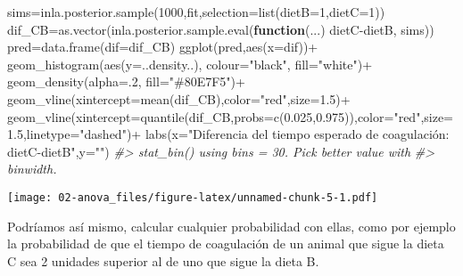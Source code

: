 \documentclass[
]{book}
\newenvironment{Shaded}{\begin{snugshade}}{\end{snugshade}}
\newcommand{\AttributeTok}[1]{\textcolor[rgb]{0.77,0.63,0.00}{#1}}
\newcommand{\CommentTok}[1]{\textcolor[rgb]{0.56,0.35,0.01}{\textit{#1}}}
\newcommand{\ControlFlowTok}[1]{\textcolor[rgb]{0.13,0.29,0.53}{\textbf{#1}}}
\newcommand{\DecValTok}[1]{\textcolor[rgb]{0.00,0.00,0.81}{#1}}
\newcommand{\FloatTok}[1]{\textcolor[rgb]{0.00,0.00,0.81}{#1}}
\newcommand{\FunctionTok}[1]{\textcolor[rgb]{0.00,0.00,0.00}{#1}}
\newcommand{\NormalTok}[1]{#1}
\newcommand{\OtherTok}[1]{\textcolor[rgb]{0.56,0.35,0.01}{#1}}
\newcommand{\SpecialCharTok}[1]{\textcolor[rgb]{0.00,0.00,0.00}{#1}}
\newcommand{\StringTok}[1]{\textcolor[rgb]{0.31,0.60,0.02}{#1}}
\begin{document}
\begin{Shaded}
\begin{Highlighting}[]
\NormalTok{sims}\OtherTok{=}\FunctionTok{inla.posterior.sample}\NormalTok{(}\DecValTok{1000}\NormalTok{,fit,}\AttributeTok{selection=}\FunctionTok{list}\NormalTok{(}\AttributeTok{dietB=}\DecValTok{1}\NormalTok{,}\AttributeTok{dietC=}\DecValTok{1}\NormalTok{))}
\NormalTok{dif\_CB}\OtherTok{=}\FunctionTok{as.vector}\NormalTok{(}\FunctionTok{inla.posterior.sample.eval}\NormalTok{(}\ControlFlowTok{function}\NormalTok{(...) dietC}\SpecialCharTok{{-}}\NormalTok{dietB, sims))}
\NormalTok{pred}\OtherTok{=}\FunctionTok{data.frame}\NormalTok{(}\AttributeTok{dif=}\NormalTok{dif\_CB)}
\FunctionTok{ggplot}\NormalTok{(pred,}\FunctionTok{aes}\NormalTok{(}\AttributeTok{x=}\NormalTok{dif))}\SpecialCharTok{+}
  \FunctionTok{geom\_histogram}\NormalTok{(}\FunctionTok{aes}\NormalTok{(}\AttributeTok{y=}\NormalTok{..density..), }\AttributeTok{colour=}\StringTok{"black"}\NormalTok{, }\AttributeTok{fill=}\StringTok{"white"}\NormalTok{)}\SpecialCharTok{+}
 \FunctionTok{geom\_density}\NormalTok{(}\AttributeTok{alpha=}\NormalTok{.}\DecValTok{2}\NormalTok{, }\AttributeTok{fill=}\StringTok{"\#80E7F5"}\NormalTok{)}\SpecialCharTok{+}
  \FunctionTok{geom\_vline}\NormalTok{(}\AttributeTok{xintercept=}\FunctionTok{mean}\NormalTok{(dif\_CB),}\AttributeTok{color=}\StringTok{"red"}\NormalTok{,}\AttributeTok{size=}\FloatTok{1.5}\NormalTok{)}\SpecialCharTok{+}
  \FunctionTok{geom\_vline}\NormalTok{(}\AttributeTok{xintercept=}\FunctionTok{quantile}\NormalTok{(dif\_CB,}\AttributeTok{probs=}\FunctionTok{c}\NormalTok{(}\FloatTok{0.025}\NormalTok{,}\FloatTok{0.975}\NormalTok{)),}\AttributeTok{color=}\StringTok{"red"}\NormalTok{,}\AttributeTok{size=}\FloatTok{1.5}\NormalTok{,}\AttributeTok{linetype=}\StringTok{"dashed"}\NormalTok{)}\SpecialCharTok{+}
  \FunctionTok{labs}\NormalTok{(}\AttributeTok{x=}\StringTok{"Diferencia del tiempo esperado de coagulación: dietC{-}dietB"}\NormalTok{,}\AttributeTok{y=}\StringTok{""}\NormalTok{)}
\CommentTok{\#\textgreater{} \textasciigrave{}stat\_bin()\textasciigrave{} using \textasciigrave{}bins = 30\textasciigrave{}. Pick better value with}
\CommentTok{\#\textgreater{} \textasciigrave{}binwidth\textasciigrave{}.}
\end{Highlighting}
\end{Shaded}

\texttt{[image: 02-anova\_files/figure-latex/unnamed-chunk-5-1.pdf]}

Podríamos así mismo, calcular cualquier probabilidad con ellas, como por ejemplo la probabilidad de que el tiempo de coagulación de un animal que sigue la dieta C sea 2 unidades superior al de uno que sigue la dieta B.
\end{document}
